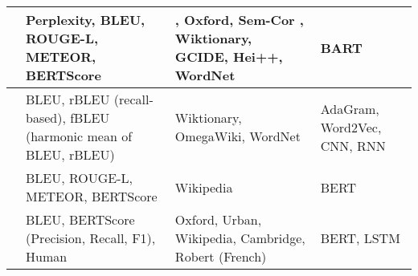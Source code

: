 \begin{longtable}{|c|p{3.5cm}|p{3.5cm}|p{3.5cm}|}
    \hline
    \cite{bevilacqua_generationary_2020} & Perplexity, BLEU, ROUGE-L, METEOR, BERTScore                     & \cite{noraset_definition_2016}, Oxford, Sem-Cor \cite{miller_semantic_1993}, Wiktionary, GCIDE, Hei++, WordNet & BART                                     \\
    \hline
    \cite{kabiri_evaluating_2020}        & BLEU, rBLEU (recall-based), fBLEU (harmonic mean of BLEU, rBLEU) & Wiktionary, OmegaWiki, WordNet                                                                                  & AdaGram, Word2Vec, CNN, RNN              \\
    \hline
    \cite{huang_cdm_2021}                & BLEU, ROUGE-L, METEOR, BERTScore                                 & Wikipedia                                                                                                       & BERT                                     \\
    \hline
    \cite{reid_vcdm_2020}                & BLEU, BERTScore (Precision, Recall, F1), Human                   & Oxford, Urban, Wikipedia, Cambridge, Robert (French)                                                            & BERT, LSTM                               \\
    \hline
\end{longtable}